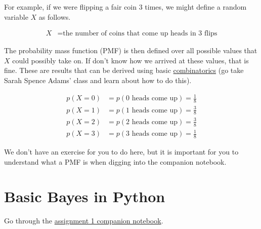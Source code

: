\documentclass[assignment01_Solutions]{subfiles}
\begin{document}
For example, if we were flipping a fair coin 3 times, we might define a random variable $X$ as follows.

\begin{align}
X&= \mbox{the number of coins that come up heads in 3 flips}
\end{align}

The probability mass function (PMF) is then defined over all possible values that $X$ could possibly take on.  If don't know how we arrived at these values, that is fine.  These are results that can be derived using basic \href{https://en.wikipedia.org/wiki/Combinatorics}{combinatorics} (go take Sarah Spence Adams' class and learn about how to do this).

\begin{align}
p(X=0) &= p(\mbox{0 heads come up}) = \frac{1}{8} \nonumber \\
p(X=1) &= p(\mbox{1 heads come up}) = \frac{3}{8} \nonumber \\
p(X=2) &= p(\mbox{2 heads come up}) = \frac{3}{8} \nonumber \\
p(X=3) &= p(\mbox{3 heads come up}) = \frac{1}{8} \nonumber 
\end{align}

We don't have an exercise for you to do here, but it is important for you to understand what a PMF is when digging into the companion notebook.

\section{Basic Bayes in Python}
\begin{externalresources}[(30 minutes)]
Go through the \href{https://colab.research.google.com/github/mlfa19/assignments/blob/master/Module\%202/01/Assignment_1_Companion_Notebook.ipynb}{assignment 1 companion notebook}.
\end{externalresources}
\end{document}
